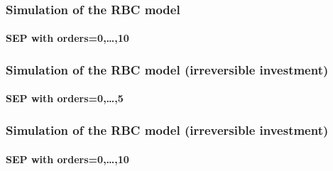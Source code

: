 \documentclass{beamer}
\begin{document}
\begin{frame}
    \frametitle{Simulation of the RBC model}
    \framesubtitle{SEP with orders=0,\dots,10}
  \begin{center}
    \scalebox{.5}{
  }
  \end{center}

\end{frame}


\begin{frame}
    \frametitle{Simulation of the RBC model (irreversible investment)}
    \framesubtitle{SEP with orders=0,\dots,5}
  \begin{center}
    \scalebox{.5}{
  }
  \end{center}

\end{frame}


\begin{frame}
    \frametitle{Simulation of the RBC model (irreversible investment)}
    \framesubtitle{SEP with orders=0,\dots,10}
  \begin{center}
    \scalebox{.5}{
  }
  \end{center}

\end{frame}
\end{document}
